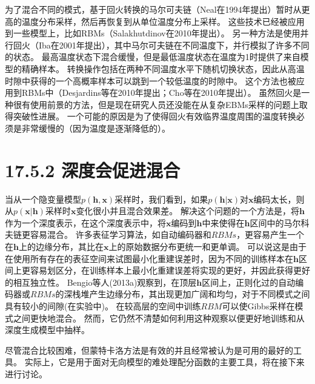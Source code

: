为了混合不同的模式，基于回火转换的马尔可夫链（Neal在1994年提出）暂时从更高的温度分布采样，然后再恢复到从单位温度分布上采样。
这些技术已经被应用到一些模型上，比如RBMs（Salakhutdinov在2010年提出）。
另一种方法是使用并行回火（Iba在2001年提出），其中马尔可夫链在不同温度下，并行模拟了许多不同的状态。
最高温度状态下混合缓慢，但是最低温度状态在温度为1时提供了来自模型的精确样本。
转换操作包括在两种不同温度水平下随机切换状态，因此从高温时隙中获得的一个高概率样本可以跳到一个较低温度的时隙中。
这个方法也被应用到RBMs中（Desjardins等在2010年提出；Cho等在2010年提出）。
虽然回火是一种很有使用前景的方法，但是现在研究人员还没能在从复杂EBMs采样的问题上取得突破性进展。
一个可能的原因是为了使得回火有效临界温度周围的温度转换必须是非常缓慢的（因为温度是逐渐降低的）。

\section{17.5.2 深度会促进混合}
\label{sec:17.5.2}

当从一个隐变量模型$p(\bm{h},\bm{x})$采样时，我们看到，如果$p(\bm{h}|\bm{x})$对$\bm{x}$编码太长，则从$p(\bm{x}|\bm{h})$采样时$\bm{x}$变化很小并且混合效果差。
解决这个问题的一个方法是，将$\bm{h}$作为一个深度表示，在这个深度表示中，将$\bm{x}$编码到$\bm{h}$中来使得在$\bm{h}$区间中的马尔科夫链更容易混合。
许多表征学习算法，如自动编码器和$RBMs$，更容易产生一个在$\bm{h}$上的边缘分布，其比在$\bm{x}$上的原始数据分布更统一和更单调。
可以说这是由于在使用所有存在的表征空间来试图最小化重建误差时，因为不同的训练样本在$\bm{h}$区间上更容易划区分，在训练样本上最小化重建误差将实现的更好，并因此获得更好的相互独立性。
Bengio等人(2013a)观察到，在顶层$\bm{h}$区间上，正则化过的自动编码器或$RBMs$的深栈堆产生边缘分布，其出现更加广阔和均匀，对于不同模式之间具有较小的间隙(在实验中)。
在较高层的空间中训练$RBM$可以使Gibbs采样在模式之间更快地混合。
然而，它仍然不清楚如何利用这种观察以便更好地训练和从深度生成模型中抽样。

尽管混合比较困难，但蒙特卡洛方法是有效的并且经常被认为是可用的最好的工具。
实际上，它是用于面对无向模型的难处理配分函数的主要工具，将在接下来进行讨论。

